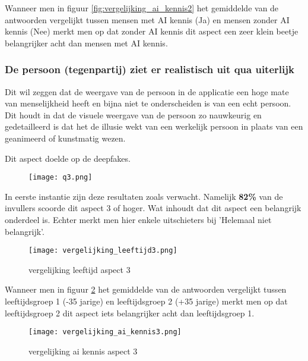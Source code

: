 Wanneer men in figuur \ref{fig:vergelijking_ai_kennis2} het gemiddelde van de antwoorden vergelijkt tussen mensen met AI kennis (Ja) en mensen zonder AI kennis (Nee) merkt men op dat zonder AI kennis dit aspect een zeer klein beetje belangrijker acht dan mensen met AI kennis.

\newpage

\subsubsection{De persoon (tegenpartij) ziet er realistisch uit qua uiterlijk}

Dit wil zeggen dat de weergave van de persoon in de applicatie een hoge mate van menselijkheid heeft en bijna niet te onderscheiden is van een echt persoon. Dit houdt in dat de visuele weergave van de persoon zo nauwkeurig en gedetailleerd is dat het de illusie wekt van een werkelijk persoon in plaats van een geanimeerd of kunstmatig wezen.

Dit aspect doelde op de deepfakes.

\begin{figure}[htbp]
    \centering
    \texttt{[image: q3.png]}
    \label{fig:vraag_3_resultaat}
\end{figure}

In eerste instantie zijn deze resultaten zoals verwacht. Namelijk \textbf{82\%} van de invullers scoorde dit aspect 3 of hoger. Wat inhoudt dat dit aspect een belangrijk onderdeel is. Echter merkt men hier enkele uitschieters bij 'Helemaal niet belangrijk'.

\begin{figure}[htbp]
    \centering
    \texttt{[image: vergelijking\_leeftijd3.png]}
    \caption{vergelijking leeftijd aspect 3}
    \label{fig:vergelijking_leeftijd3}
\end{figure}

Wanneer men in figuur \ref{fig:vergelijking_leeftijd3} het gemiddelde van de antwoorden vergelijkt tussen leeftijdsgroep 1 (-35 jarige) en leeftijdsgroep 2 (+35 jarige) merkt men op dat leeftijdsgroep 2 dit aspect iets belangrijker acht dan leeftijdsgroep 1.

\begin{figure}[htbp]
    \centering
    \texttt{[image: vergelijking\_ai\_kennis3.png]}
    \caption{vergelijking ai kennis aspect 3}
    \label{fig:vergelijking_ai_kennis3}
\end{figure}

